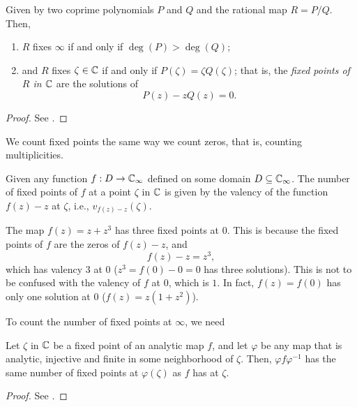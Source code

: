 \begin{proposition}
    Given by two coprime polynomials $P$ and $Q$ and the rational map $R = P/Q$.
    Then,
    \begin{enumerate}[label=(\roman*)]
        \item $R$ fixes $\infty$ if and only if $\deg(P) > \deg(Q)$;
        \item and $R$ fixes $\zeta \in \mathbb{C}$ if and only if $P(\zeta) = \zeta
        Q(\zeta)$; that is, the \emph{fixed points of $R$ in $\mathbb{C}$} are the
        solutions of 
        \begin{equation*}
            P(z) - z Q(z) = 0.
        \end{equation*}
    \end{enumerate}
\end{proposition}
\begin{proof}
    See \cite[39]{Beardon1991}.
\end{proof}

We count fixed points the same way we count zeros, that is, counting
multiplicities.

\begin{definition}
    Given any function $f : D \to \mathbb{C}_\infty$ defined on some domain $D \subseteq
    \mathbb{C}_\infty$. The number of fixed points of $f$ at a point $\zeta$ in $\mathbb{C}$ is
    given by the valency of the function $f(z) - z$ at $\zeta$, i.e.,
    $v_{f(z)-z}(\zeta)$.
\end{definition}

\begin{example}
    The map $f(z) = z + z^3$ has three fixed points at $0$. This is because the
    fixed points of $f$ are the zeros of $f(z) - z$, and
    \begin{equation*}
        f(z) - z = z^3,
    \end{equation*}
    which has valency $3$ at $0$ ($z^3 = f(0) - 0 = 0$ has three solutions).
    This is not to be confused with the valency of $f$ at $0$, which is $1$. In
    fact, $f(z) = f(0)$ has only one solution at $0$ ($f(z) = z(1 + z^2)$).
\end{example}

To count the number of fixed points at $\infty$, we need

\begin{lemma}
    \label{lem:number_of_fixed_points_is_preserved_under_conjugacy_in_C}
    Let $\zeta$ in $\mathbb{C}$ be a fixed point of an analytic map $f$, and let
    $\varphi$ be any map that is analytic, injective and finite in some
    neighborhood of $\zeta$. Then, $\varphi f \varphi^{-1}$ has the same number
    of fixed points at $\varphi(\zeta)$ as $f$ has at $\zeta$.
\end{lemma}
\begin{proof}
    See \cite[39--40]{Beardon1991}.
\end{proof}

